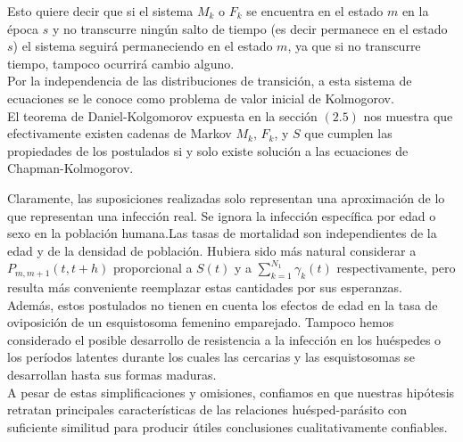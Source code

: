 Esto quiere decir que si el sistema $M_k$ o $F_k$ se encuentra en el estado $m$ en la época $s$ y no transcurre ningún salto de tiempo (es decir permanece en el estado $s$) el sistema seguirá permaneciendo en el estado $m$, ya que si no transcurre tiempo, tampoco ocurrirá cambio alguno.\\
Por la independencia de las distribuciones de transición, a esta sistema de ecuaciones se le conoce como problema de valor inicial de Kolmogorov.\\ El teorema de Daniel-Kolgomorov expuesta en la sección $(2.5)$ nos muestra que efectivamente existen cadenas de Markov $M_k$, $F_k$, y $S$ que cumplen las propiedades de los postulados si y solo existe solución a las ecuaciones de Chapman-Kolmogorov.\\
\begin{Obs}
    Claramente, las suposiciones realizadas solo representan una aproximación de lo que representan una infección real. Se ignora la infección específica por edad o sexo en la población humana.Las tasas de mortalidad son independientes de la edad y de la densidad de población. Hubiera sido más natural considerar a $P_{m,m+1}(t,t+h)$ 
    proporcional a $S(t)$ y a $\sum_{k=1}^{N_1}\gamma_k(t)$ respectivamente, pero resulta más conveniente reemplazar estas cantidades por sus esperanzas.\\
    Además, estos postulados no tienen en cuenta los efectos de edad en la tasa de oviposición de un esquistosoma femenino emparejado. Tampoco hemos considerado el posible desarrollo de resistencia a la infección en los huéspedes o los períodos latentes durante los cuales las cercarias y las esquistosomas se desarrollan hasta sus formas maduras.\\A pesar de estas simplificaciones y omisiones, confiamos en que nuestras hipótesis retratan principales
    características de las relaciones huésped-parásito con suficiente similitud para producir útiles conclusiones cualitativamente confiables.
\end{Obs}